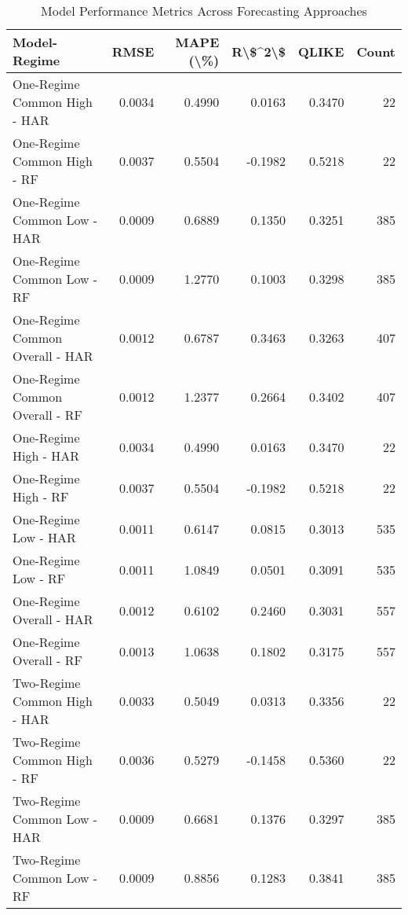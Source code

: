 \documentclass{article}
\begin{document}

\begin{table}
\centering
\caption{Model Performance Metrics Across Forecasting Approaches}
\label{tab:model_performance_metrics_2}
\begin{tabular}{lrrrrr}
\toprule
                    Model-Regime &   RMSE &  MAPE (\textbackslash \%) &  R\textbackslash \$\textasciicircum 2\textbackslash \$ &  QLIKE &  Count \\
\midrule
    One-Regime Common High - HAR & 0.0034 &     0.4990 &   0.0163 & 0.3470 &     22 \\
    One-Regime Common High - RF & 0.0037 &     0.5504 &  -0.1982 & 0.5218 &     22 \\
    One-Regime Common Low - HAR & 0.0009 &     0.6889 &   0.1350 & 0.3251 &    385 \\
        One-Regime Common Low - RF & 0.0009 &     1.2770 &   0.1003 & 0.3298 &    385 \\
One-Regime Common Overall - HAR & 0.0012 &     0.6787 &   0.3463 & 0.3263 &    407 \\
    One-Regime Common Overall - RF & 0.0012 &     1.2377 &   0.2664 & 0.3402 &    407 \\
            One-Regime High - HAR & 0.0034 &     0.4990 &   0.0163 & 0.3470 &     22 \\
            One-Regime High - RF & 0.0037 &     0.5504 &  -0.1982 & 0.5218 &     22 \\
            One-Regime Low - HAR & 0.0011 &     0.6147 &   0.0815 & 0.3013 &    535 \\
            One-Regime Low - RF & 0.0011 &     1.0849 &   0.0501 & 0.3091 &    535 \\
        One-Regime Overall - HAR & 0.0012 &     0.6102 &   0.2460 & 0.3031 &    557 \\
        One-Regime Overall - RF & 0.0013 &     1.0638 &   0.1802 & 0.3175 &    557 \\
    Two-Regime Common High - HAR & 0.0033 &     0.5049 &   0.0313 & 0.3356 &     22 \\
    Two-Regime Common High - RF & 0.0036 &     0.5279 &  -0.1458 & 0.5360 &     22 \\
    Two-Regime Common Low - HAR & 0.0009 &     0.6681 &   0.1376 & 0.3297 &    385 \\
        Two-Regime Common Low - RF & 0.0009 &     0.8856 &   0.1283 & 0.3841 &    385 \\

\end{tabular}
\end{table}
\end{document}
